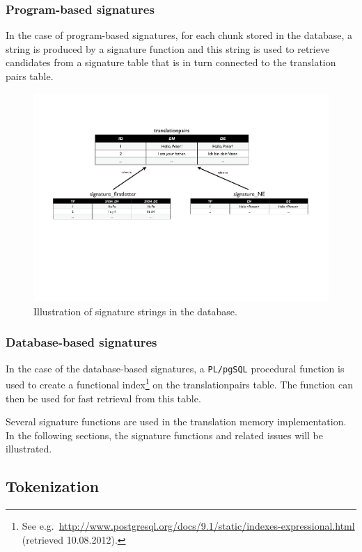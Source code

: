 \subsubsection*{Program-based signatures}

In the case of program-based signatures, for each chunk stored in the database, a string is produced by a signature function and this string is used to retrieve candidates from a signature table that is in turn
connected to the translation pairs table.

\begin{figure}[h!]
	\centering
		\includegraphics[width=17cm]{figures/core/signatures.pdf}
	\caption{Illustration of signature strings in the database.}
	\label{fig:figures_core_signatures}
\end{figure}


\subsubsection*{Database-based signatures}

In the case of the database-based signatures, a {\tt PL/pgSQL} procedural function is used to create a functional index\footnote{See e.g.\ \url{http://www.postgresql.org/docs/9.1/static/indexes-expressional.html} (retrieved 10.08.2012).} on the translationpairs table. The function can then be used for fast retrieval from this table.


Several signature functions are used in the translation memory
implementation. In the following sections, the signature functions and related issues will be illustrated.

\subsection{Tokenization}

